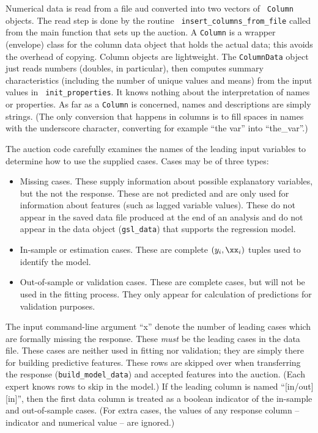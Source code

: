 \documentclass[12pt]{article}
\begin{document}
 Numerical data is read from a file aud converted into two vectors of {\tt
 Column} objects.  The read step is done by the routine {\tt
 insert\_columns\_from\_file} called from the main function that sets up the
 auction.  A {\tt Column} is a wrapper (envelope) class for the column data
 object that holds the actual data; this avoids the overhead of copying.  Column
 objects are lightweight.  The {\tt ColumnData} object just reads numbers
 (doubles, in particular), then computes summary characteristics (including the
 number of unique values and means) from the input values in {\tt
 init\_properties}.  It knows nothing about the interpretation of names or
 properties.  As far as a {\tt Column} is concerned, names and descriptions are
 simply strings.  (The only conversion that happens in columns is to fill spaces
 in names with the underscore character, converting for example ``the var'' into
 ``the\_var''.)

 The auction code carefully examines the names of the leading input variables to
 determine how to use the supplied cases.  Cases may be of three types:
\begin{itemize}
\item Missing cases.  These supply information about possible explanatory
 variables, but the not the response.  These are not predicted and are only used
 for information about features (such as lagged variable values).  These do not
 appear in the saved data file produced at the end of an analysis and do not
 appear in the data object ({\tt gsl\_data}) that supports the regression model.
\item In-sample or estimation cases.  These are complete $(y_i,\xx_i)$ tuples
 used to identify the model.
\item Out-of-sample or validation cases. These are complete cases, but will not
 be used in the fitting process.  They only appear for calculation of
 predictions for validation purposes.
\end{itemize}
 The input command-line argument ``x'' denote the number of leading cases which
 are formally missing the response.  These {\em must} be the leading cases in
 the data file.  These cases are neither used in fitting nor validation; they
 are simply there for building predictive features.  These rows are skipped over
 when transferring the response ({\tt build\_model\_data}) and accepted features
 into the auction.  (Each expert knows rows to skip in the model.)  If the
 leading column is named ``[in/out][in]'', then the first data column is treated
 as a boolean indicator of the in-sample and out-of-sample cases.  (For extra
 cases, the values of any response column -- indicator and numerical value --
 are ignored.)
\end{document}

